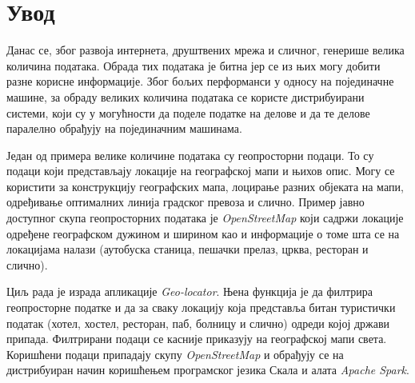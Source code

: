 \documentclass[12pt,oneside]{memoir}
\begin{document}
\frontmatter
\naslovna
\komisija
\apstrakt
\tableofcontents*

\mainmatter


\chapter{Увод}
\label{chp:uvod}

Данас се, због развоја интернета, друштвених мрежа и сличног, генерише велика количина података. Обрада тих података је битна јер се из њих могу добити разне корисне информације. Због бољих перформанси у односу на појединачне машине, за обраду великих количина података се користе дистрибуирани системи, који су у могућности да поделе податке на делове и да те делове паралелно обрађују на појединачним машинама.

Један од примера велике количине података су геопросторни подаци. То су подаци који представљају локације на географској мапи и њихов опис. Могу се користити за конструкцију географских мапа, лоцирање разних објеката на мапи, одређивање оптималних линија градског превоза и слично. Пример јавно доступног скупа геопросторних података је \textit{OpenStreetMap} који садржи локације одређене географском дужином и ширином као и информације о томе шта се на локацијама налази (аутобуска станица, пешачки прелаз, црква, ресторан и слично).

Циљ рада је израда апликације \textit{Geo-locator}. Њена функција је да филтрира геопросторне податке и да за сваку локацију која представља битан туристички податак (хотел, хостел, ресторан, паб, болницу и слично) одреди којој држави припада. Филтрирани подаци се касније приказују на географској мапи света. Коришћени подаци припадају скупу \textit{OpenStreetMap} и обрађују се на дистрибуиран начин коришћењем програмског језика Скала и алата \textit{Apache Spark}.
\end{document}
